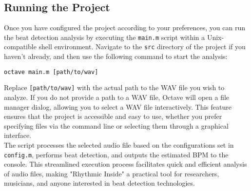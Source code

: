 \subsection{Running the Project}

Once you have configured the project according to your preferences, you can run the beat detection analysis by executing the \texttt{main.m} script within a Unix-compatible shell environment. Navigate to the \texttt{src} directory of the project if you haven't already, and then use the following command to start the analysis:

\lstset{style=ShellStyle}
\begin{lstlisting}[caption={Running the project}, label=lst]
octave main.m [path/to/wav]
\end{lstlisting}

Replace \texttt{[path/to/wav]} with the actual path to the WAV file you wish to analyze. If you do not provide a path to a WAV file, Octave will open a file manager dialog, allowing you to select a WAV file interactively. This feature ensures that the project is accessible and easy to use, whether you prefer specifying files via the command line or selecting them through a graphical interface. \\

The script processes the selected audio file based on the configurations set in \texttt{config.m}, performs beat detection, and outputs the estimated BPM to the console. This streamlined execution process facilitates quick and efficient analysis of audio files, making "Rhythmic Inside" a practical tool for researchers, musicians, and anyone interested in beat detection technologies.

